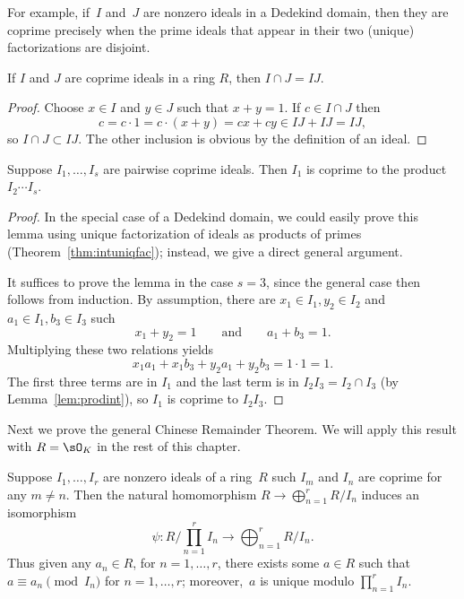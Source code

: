 For example, if~$I$ and~$J$ are nonzero ideals in a Dedekind domain,
then they are coprime precisely when the prime ideals that appear in
their two (unique) factorizations are disjoint.

\begin{lemma}\label{lem:prodint}
If $I$ and $J$ are coprime ideals in a ring $R$, then
$I\cap{}J = IJ$.
\end{lemma}
\begin{proof}
Choose $x\in I$ and $y\in J$
such that $x+y=1$.  If $c\in{} I\cap{} J$ then
$$c=c\cdot 1=c\cdot (x+y) = cx + cy \in IJ + IJ = IJ,$$
so $I\cap{} J\subset IJ$.
The other inclusion is obvious by the definition of an ideal.
\end{proof}

\begin{lemma}\label{lem:coprime_prod}
Suppose $I_1, \dots, I_s$ are pairwise coprime ideals.
Then $I_1$ is coprime to the product $I_2\cdots I_s$.
\end{lemma}
\begin{proof}
In the special case of a Dedekind domain, we could easily
prove this lemma using unique factorization of ideals as
products of primes (Theorem~\ref{thm:intuniqfac}); instead,
we give a direct general argument.

It suffices to prove the lemma in the case $s=3$, since the
general case then follows from induction.
By assumption, there
are $x_1 \in I_1, y_2 \in I_2$ and $a_1 \in I_1, b_3 \in I_3$
such
$$
x_1 + y_2 = 1 \qquad\text{and}\qquad a_1 + b_3 = 1.
$$
Multiplying these two relations yields
$$
x_1 a_1 + x_1 b_3 + y_2 a_1 + y_2 b_3 = 1 \cdot 1 = 1.
$$
The first three terms are in $I_1$ and the last term is in
$I_2 I_3 = I_2 \cap I_3$ (by Lemma~\ref{lem:prodint}),
so $I_1$ is coprime to $I_2 I_3$.
\end{proof}

Next we prove the general Chinese Remainder Theorem.
We will apply this result with $R=\sO_K$ in the rest of this chapter.
\begin{theorem}\label{thm:crt}
Suppose $I_1, \dots, I_r$ are nonzero ideals of a ring~$R$ such
$I_m$ and $I_n$ are coprime for any $m\neq n$.  Then the natural
homomorphism $R \to \bigoplus_{n=1}^r R/I_n$ induces an isomorphism
$$
\psi: R/\prod_{n=1}^r I_n \to \bigoplus_{n=1}^r R/I_n.
$$
Thus given any $a_n \in R$, for $n=1, \dots,r$, there exists some $a\in R$
such that $a \equiv a_n\pmod{I_n}$ for $n=1, \dots, r$; moreover,~$a$
is unique modulo $\prod_{n=1}^r I_n$.
\end{theorem}


